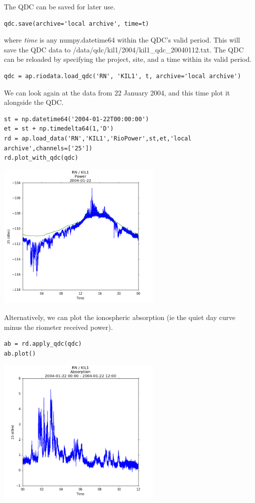 \documentclass{article}
\begin{document}
The QDC can be saved for later use.

\begin{lstlisting}[style=pythonstyle]
qdc.save(archive='local archive', time=t)
\end{lstlisting}

\noindent where {\it time} is any numpy.datetime64 within the QDC's valid period. This will save the QDC data to /data/qdc/kil1/2004/kil1\_qdc\_20040112.txt.
The QDC can be reloaded by specifying the project, site, and a time within its valid period.
\begin{lstlisting}[style=pythonstyle]
qdc = ap.riodata.load_qdc('RN', 'KIL1', t, archive='local archive')
\end{lstlisting}

We can look again at the data from 22 January 2004, and this time plot it alongside the QDC.

\begin{lstlisting}[style=pythonstyle]
st = np.datetime64('2004-01-22T00:00:00')
et = st + np.timedelta64(1,'D')
rd = ap.load_data('RN','KIL1','RioPower',st,et,'local archive',channels=['25'])
rd.plot_with_qdc(qdc)
\end{lstlisting}

\includegraphics[width=8cm]{images/figure_4.png}


\noindent Alternatively, we can plot the ionospheric absorption (ie the quiet day curve minus the riometer received power).
\begin{lstlisting}[style=pythonstyle]
ab = rd.apply_qdc(qdc)
ab.plot()
\end{lstlisting}

\includegraphics[width=8cm]{images/figure_5.png}
\end{document}
